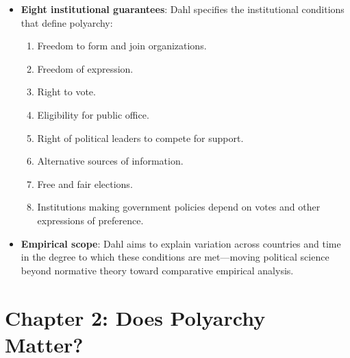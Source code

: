 \documentclass[12pt]{article}
\begin{document}
\begin{itemize}[leftmargin=*, itemsep=4pt]
    \item \textbf{Eight institutional guarantees}: Dahl specifies the institutional conditions that define polyarchy:
        \begin{enumerate}
            \item Freedom to form and join organizations.
            \item Freedom of expression.
            \item Right to vote.
            \item Eligibility for public office.
            \item Right of political leaders to compete for support.
            \item Alternative sources of information.
            \item Free and fair elections.
            \item Institutions making government policies depend on votes and other expressions of preference.
        \end{enumerate}
    \item \textbf{Empirical scope}: Dahl aims to explain variation across countries and time in the degree to which these conditions are met---moving political science beyond normative theory toward comparative empirical analysis.
\end{itemize}

\section{Chapter 2: Does Polyarchy Matter?}
\end{document}
